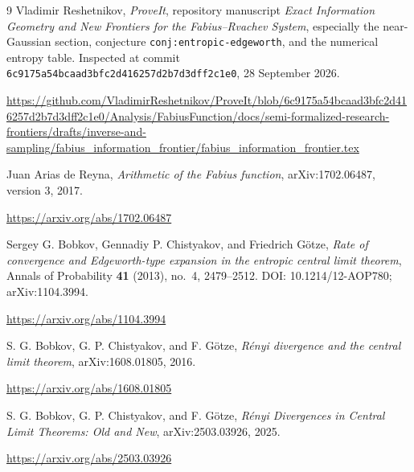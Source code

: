 \documentclass[11pt,a4paper]{article}
\numberwithin{equation}{section}
\theoremstyle{definition}
\theoremstyle{remark}
\newcommand{\commit}{\nolinkurl{6c9175a54bcaad3bfc2d416257d2b7d3dff2c1e0}}
\begin{document}
\begin{thebibliography}{9}
Vladimir Reshetnikov, \emph{ProveIt}, repository manuscript
\emph{Exact Information Geometry and New Frontiers for the Fabius--Rvachev
System}, especially the near-Gaussian section, conjecture
\texttt{conj:entropic-edgeworth}, and the numerical entropy table.
Inspected at commit \commit, 28 September 2026.\par
\url{https://github.com/VladimirReshetnikov/ProveIt/blob/6c9175a54bcaad3bfc2d416257d2b7d3dff2c1e0/Analysis/FabiusFunction/docs/semi-formalized-research-frontiers/drafts/inverse-and-sampling/fabius_information_frontier/fabius_information_frontier.tex}

Juan Arias de Reyna, \emph{Arithmetic of the Fabius function},
arXiv:1702.06487, version 3, 2017.\par
\url{https://arxiv.org/abs/1702.06487}

Sergey G. Bobkov, Gennadiy P. Chistyakov, and Friedrich G\"otze,
\emph{Rate of convergence and Edgeworth-type expansion in the entropic central
limit theorem}, Annals of Probability \textbf{41} (2013), no.~4, 2479--2512.
DOI: 10.1214/12-AOP780; arXiv:1104.3994.\par
\url{https://arxiv.org/abs/1104.3994}

S. G. Bobkov, G. P. Chistyakov, and F. G\"otze,
\emph{R\'enyi divergence and the central limit theorem},
arXiv:1608.01805, 2016.\par
\url{https://arxiv.org/abs/1608.01805}

S. G. Bobkov, G. P. Chistyakov, and F. G\"otze,
\emph{R\'enyi Divergences in Central Limit Theorems: Old and New},
arXiv:2503.03926, 2025.\par
\url{https://arxiv.org/abs/2503.03926}
\end{thebibliography}
\end{document}
